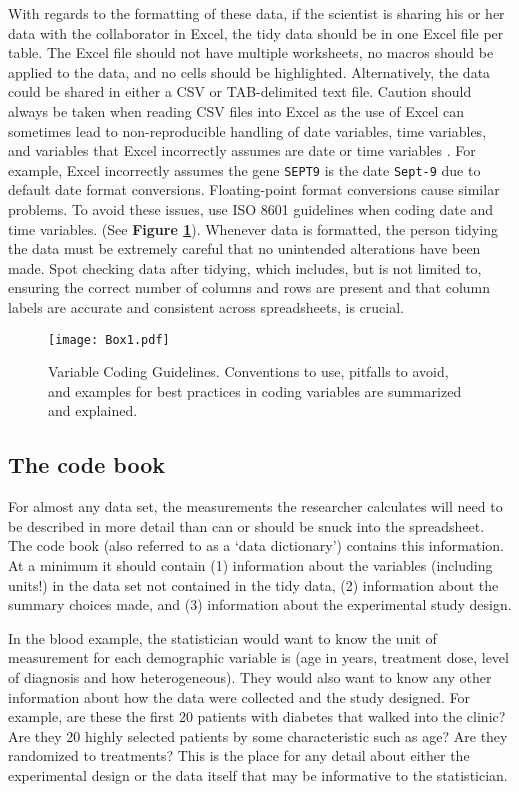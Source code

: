 \documentclass[12pt]{article}
\begin{document}
With regards to the formatting of these data, if the scientist is
sharing his or her data with the collaborator in Excel, the tidy data
should be in one Excel file per table. The Excel file should not have
multiple worksheets, no macros should be applied to the data, and no
cells should be highlighted. Alternatively, the data could be shared in
either a CSV or TAB-delimited text file. Caution should always be taken
when reading CSV files into Excel as the use of Excel can sometimes lead
to non-reproducible handling of date variables, time variables, and
variables that Excel incorrectly assumes are date or time variables
\citep{zeeberg_mistaken_2004}. For example, Excel incorrectly assumes
the gene \texttt{SEPT9} is the date \texttt{Sept-9} due to default date
format conversions. Floating-point format conversions cause similar
problems. To avoid these issues, use ISO 8601 \citep{newman_date_nodate}
guidelines when coding date and time variables. (See \textbf{Figure
\ref{fig2}}). Whenever data is formatted, the person tidying the data
must be extremely careful that no unintended alterations have been made.
Spot checking data after tidying, which includes, but is not limited to,
ensuring the correct number of columns and rows are present and that
column labels are accurate and consistent across spreadsheets, is
crucial.

\begin{figure}[htbp]
\centering
\texttt{[image: Box1.pdf]}
\caption{Variable Coding Guidelines. Conventions to use, pitfalls to
avoid, and examples for best practices in coding variables are
summarized and explained. \label{fig2}}
\end{figure}

\subsection{The code book}\label{the-code-book}

For almost any data set, the measurements the researcher calculates will
need to be described in more detail than can or should be snuck into the
spreadsheet. The code book (also referred to as a `data dictionary')
contains this information. At a minimum it should contain (1)
information about the variables (including units!) in the data set not
contained in the tidy data, (2) information about the summary choices
made, and (3) information about the experimental study design.

In the blood example, the statistician would want to know the unit of
measurement for each demographic variable is (age in years, treatment
dose, level of diagnosis and how heterogeneous). They would also want to
know any other information about how the data were collected and the
study designed. For example, are these the first 20 patients with
diabetes that walked into the clinic? Are they 20 highly selected
patients by some characteristic such as age? Are they randomized to
treatments? This is the place for any detail about either the
experimental design or the data itself that may be informative to the
statistician.
\end{document}
